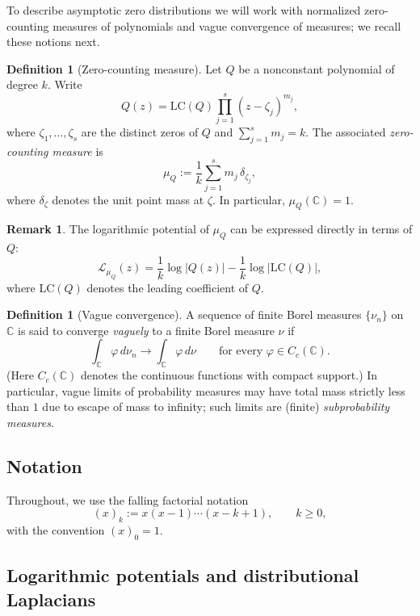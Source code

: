 \documentclass[12pt]{article}
\theoremstyle{plain}
\theoremstyle{definition}
\newtheorem{definition}[theorem]{Definition}
\newtheorem{remark}[theorem]{Remark}
\begin{document}
To describe asymptotic zero distributions we will work with normalized zero-counting measures of polynomials and vague convergence of measures; we recall these notions next.

\begin{definition}[Zero-counting measure]\label{def:zcmeasure}
Let $Q$ be a nonconstant polynomial of degree $k$. Write
$$Q(z)=\mathrm{LC}(Q)\prod_{j=1}^{s}(z-\zeta_j)^{m_j},$$
where $\zeta_1,\dots,\zeta_s$ are the distinct zeros of $Q$ and $\sum_{j=1}^s m_j=k$. The associated \emph{zero-counting measure} is
\begin{equation}\label{zcmeas1}
\mu_Q:=\frac{1}{k}\sum_{j=1}^{s} m_j\,\delta_{\zeta_j},
\end{equation}
where $\delta_{\zeta}$ denotes the unit point mass at $\zeta$. In particular, $\mu_Q(\mathbb C)=1$.
\end{definition}

\begin{remark}\label{rem:logpot_poly}
The logarithmic potential of $\mu_Q$ can be expressed directly in terms of $Q$:
\begin{equation}\label{logpot_poly}
\mathcal L_{\mu_Q}(z)=\frac{1}{k}\log|Q(z)|-\frac{1}{k}\log|\mathrm{LC}(Q)|,
\end{equation}
where $\mathrm{LC}(Q)$ denotes the leading coefficient of $Q$.
\end{remark}

\begin{definition}[Vague convergence]\label{def:vague}
A sequence of finite Borel measures $\{\nu_n\}$ on $\mathbb C$ is said to converge \emph{vaguely} to a finite Borel measure $\nu$ if
$$\int_{\mathbb C}\varphi\,d\nu_n\longrightarrow \int_{\mathbb C}\varphi\,d\nu
\qquad\text{for every }\varphi\in C_c(\mathbb C).$$
(Here $C_c(\mathbb C)$ denotes the continuous functions with compact support.)
In particular, vague limits of probability measures may have total mass strictly less than $1$ due to escape of mass to infinity; such limits are (finite) \emph{subprobability measures}.
\end{definition}

\subsection{Notation}
Throughout, we use the falling factorial notation
$$(x)_k := x(x-1)\cdots(x-k+1),\qquad k\ge0,$$
with the convention $(x)_0=1$.

\subsection{Logarithmic potentials and distributional Laplacians}\label{sub:sec2_logpot}
\end{document}
